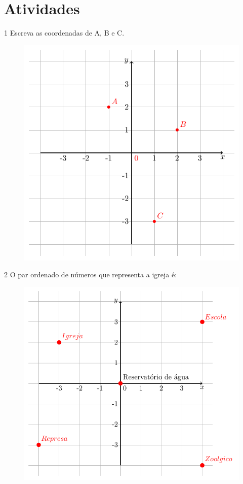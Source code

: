 \section*{Atividades}

\num{1} Escreva as coordenadas de A, B e C.

\begin{figure}[htpb!]
\centering
\includegraphics[width=.7\textwidth]{./tikz/020.pdf}
\end{figure}

\begin{emptybox}
\end{emptybox}

\pagebreak
\num{2} O par ordenado de números que representa a igreja é:

\begin{figure}[htpb!]
\centering
\includegraphics[width=.7\textwidth]{./tikz/021.pdf}
\end{figure}

